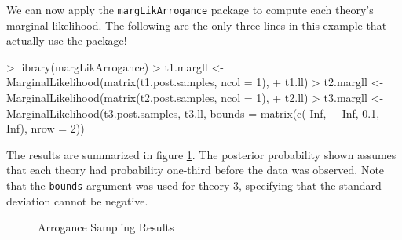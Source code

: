 \documentclass[letterpaper,12pt]{article}
\begin{document}
We can now apply the \texttt{margLikArrogance} package to compute each
theory's marginal likelihood.  The following are the only three lines
in this example that actually use the package!

\begin{Schunk}
\begin{Sinput}
> library(margLikArrogance)
> t1.margll <- MarginalLikelihood(matrix(t1.post.samples, ncol = 1), 
+     t1.ll)
> t2.margll <- MarginalLikelihood(matrix(t2.post.samples, ncol = 1), 
+     t2.ll)
> t3.margll <- MarginalLikelihood(t3.post.samples, t3.ll, bounds = matrix(c(-Inf, 
+     Inf, 0.1, Inf), nrow = 2))
\end{Sinput}
\end{Schunk}

\noindent The results are summarized in figure \ref{results}.  The
posterior probability shown assumes that each theory had probability
one-third before the data was observed.  Note that the \texttt{bounds}
argument was used for theory 3, specifying that the standard deviation
cannot be negative.

\begin{figure}[htp] \normalsize 
\begin{center}
 \caption{Arrogance Sampling Results} \label{results} \end{center}\end{figure}
\end{document}
